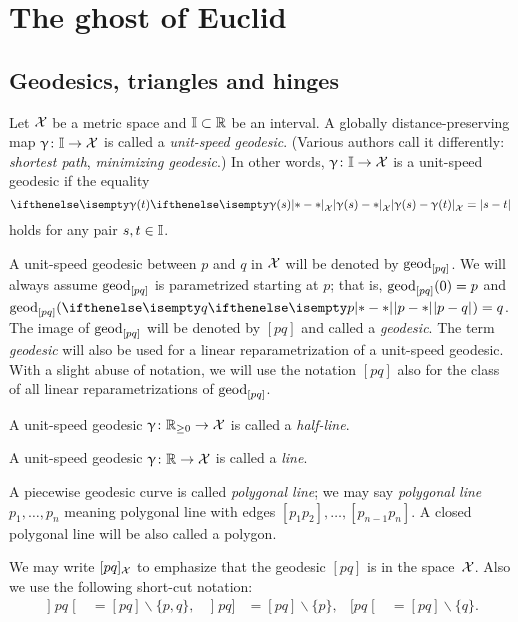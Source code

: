 \chapter{The ghost of Euclid}

\section{Geodesics, triangles and hinges}
\label{sec:geods}

Let $\mathcal{X}$ be a metric space and $\II\subset \R$\index{$\II$} be an interval. 
A globally distance-preserving map $\gamma\:\II\to \spc{X}$ is called a \emph{unit-speed geodesic}.
(Various authors call it differently: \emph{shortest path}, \emph{minimizing geodesic}.)
In other words, $\gamma\:\II\to \spc{X}$ is a unit-speed geodesic if the equality
\[\dist{\gamma(s)}{\gamma(t)}{\spc{X}}=|s-t|\]
holds for any pair $s,t\in \II$.

A unit-speed geodesic between $p$ and $q$ in $\mathcal{X}$ will be denoted by $\mathrm{geod}_{[p q]}$\index{$\geod_{[{p}{q}]}$}.
We will always assume $\mathrm{geod}_{[p q]}$ is parametrized starting at $p$; 
that is, $\mathrm{geod}_{[p q]}(0)=p$ and $\geod_{[p q]}(\dist{p}{q}{})=q$.
The image of $\mathrm{geod}_{[p q]}$ will be denoted by $[p q]$\index{$[{p}{q}]$} and called a \emph{geodesic}.
The term \emph{geodesic} will also be used for a linear reparametrization of a unit-speed geodesic.
With a slight abuse of notation, we will use the notation $[p q]$ also for the class of all linear reparametrizations of $\mathrm{geod}_{[p q]}$.

A unit-speed geodesic $\gamma\:\RR_{\ge0}\to \spc{X}$ is called a \emph{half-line}.

A unit-speed geodesic  $\gamma\:\RR\to \spc{X}$ is called a \emph{line}.

A piecewise geodesic curve is called \emph{polygonal line};
we may say \textit{polygonal line $p_1,\dots,p_n$} meaning polygonal line with edges $[p_1p_2],\dots,[p_{n-1}p_n]$.
A closed polygonal line will be also called a polygon.


We may write $[p q]_{\mathcal{X}}$ 
to emphasize that the geodesic $[p q]$ is in the space~${\mathcal{X}}$.
Also we use the following short-cut notation:
\begin{align*}
\mathopen{]} p q \mathclose{[}&=[pq]\backslash\{p,q\},
&
\mathopen{]} p q ]&=[pq]\backslash\{p\},
&
[ p q \mathclose{[}&=[pq]\backslash\{q\}.
\end{align*}

